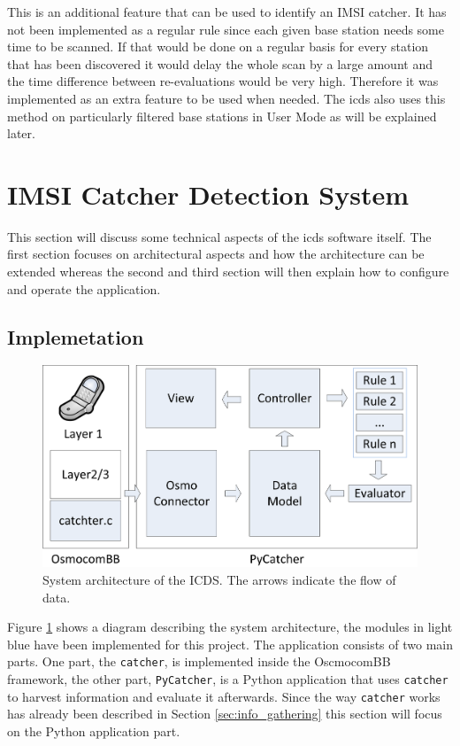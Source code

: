 This is an additional feature that can be used to identify an IMSI catcher.
It has not been implemented as a regular rule since each given base station needs some time to be scanned.
If that would be done on a regular basis for every station that has been discovered it would delay the whole scan by a large amount and the time difference between re-evaluations would be very high.
Therefore it was implemented as an extra feature to be used when needed.
The \gls{icds} also uses this method on particularly filtered base stations in User Mode as will be explained later.


\section{IMSI Catcher Detection System}
\label{sec:icds}
This section will discuss some technical aspects of the \gls{icds} software itself.
The first section focuses on architectural aspects and how the architecture can be extended whereas the second and third section will then explain how to configure and operate the application.

\subsection{Implemetation}
\begin{figure}
\centering
\includegraphics{../Images/Architecture_software}
\caption{System architecture of the ICDS. The arrows indicate the flow of data.}
\label{fig:architecture}
\end{figure}
Figure \ref{fig:architecture} shows a diagram describing the system architecture, the modules in light blue have been implemented for this project.
The application consists of two main parts.
One part, the \texttt{catcher}, is implemented inside the OscmocomBB framework, the other part, \texttt{PyCatcher}, is a Python application that uses \texttt{catcher} to harvest information and evaluate it afterwards.
Since the way \texttt{catcher} works has already been described in Section \ref{sec:info_gathering} this section will focus on the Python application part.


